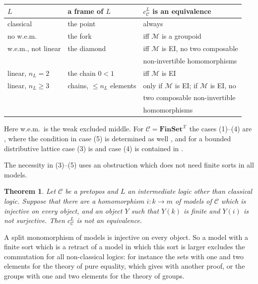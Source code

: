 \documentclass[11pt]{amsart}
\newtheorem{thm}{Theorem}[section]
\theoremstyle{definition}
\newcommand{\Fin}{\mathbf{FinSet}}
\newcommand{\cX}{\mathcal X}
\newcommand{\cC}{\mathcal C}
\newcommand{\cM}{\mathcal M}
\begin{document}
\begin{center}
\begin{tabular}{lll}
$L$&a frame of $L$&$c^L_\cC$ is an equivalence\\\hline
classical&the point&always\\
no w.e.m.&the fork&iff $\cM$ is a groupoid\\
w.e.m., not linear&the diamond&iff $\cM$ is EI, no two composable\\
&&non-invertible homomorphisms\\
linear, $n_L=2$&the chain $0<1$&iff $\cM$ is EI\\
linear, $n_L\ge3$&chains, $\le n_L$ elements&only if $\cM$ is EI; if
$\cM$ is EI, no\\
&&two composable non-invertible\\
&&homomorphisms
\end{tabular}
\end{center}
Here w.e.m.\ is the weak excluded middle. For $\cC=\Fin^{\cX}$ the
cases (1)--(4) are \cite[Thm.~1.1]{Classify}, where the condition in
case (5) is determined as well \cite{Strings}, and for a bounded
distributive lattice case (3) is \cite[Thm.~5.1]{Classify} and case
(4) is contained in \cite[Thm.~6.3]{Interm}.

The necessity in (3)--(5) uses an obstruction which does not need
finite sorts in all models.

\begin{thm}\label{thm:obstruction}
Let $\cC$ be a pretopos and $L$ an intermediate logic other than
classical logic. Suppose that there are a homomorphism $i\colon k\to m$
of models of $\cC$ which is injective on every object, and an object
$Y$ such that $Y(k)$ is finite and $Y(i)$ is not surjective. Then
$c^L_\cC$ is not an equivalence.
\end{thm}

A split monomorphism of models is injective on every object. So a
model with a finite sort which is a retract of a model in which this
sort is larger excludes the commutation for all non-classical logics:
for instance the sets with one and two elements for the theory of
pure equality, which gives \cite[Thm.~7.2]{Interm} with another proof,
or the groups with one and two elements for the theory of groups.
\end{document}
